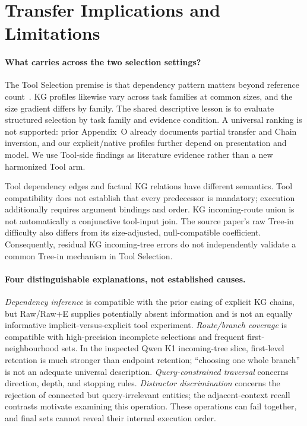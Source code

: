 \section{Transfer Implications and Limitations}
\label{sec:discussion}
\paragraph{What carries across the two selection settings?}
The Tool Selection premise is that dependency pattern matters beyond reference count~\cite{anonymousToolGraph}. KG profiles likewise vary across task families at common sizes, and the size gradient differs by family. The shared descriptive lesson is to evaluate structured selection by task family and evidence condition. A universal ranking is not supported: prior Appendix~O already documents partial transfer and Chain inversion, and our explicit/native profiles further depend on presentation and model. We use Tool-side findings as literature evidence rather than a new harmonized Tool arm.

Tool dependency edges and factual KG relations have different semantics. Tool compatibility does not establish that every predecessor is mandatory; execution additionally requires argument bindings and order. KG incoming-route union is not automatically a conjunctive tool-input join. The source paper's raw Tree-in difficulty also differs from its size-adjusted, null-compatible coefficient. Consequently, residual KG incoming-tree errors do not independently validate a common Tree-in mechanism in Tool Selection.

\paragraph{Four distinguishable explanations, not established causes.}
\emph{Dependency inference} is compatible with the prior easing of explicit KG chains, but Raw/Raw+E supplies potentially absent information and is not an equally informative implicit-versus-explicit tool experiment. \emph{Route/branch coverage} is compatible with high-precision incomplete selections and frequent first-neighbourhood sets. In the inspected Qwen K1 incoming-tree slice, first-level retention is much stronger than endpoint retention; ``choosing one whole branch'' is not an adequate universal description. \emph{Query-constrained traversal} concerns direction, depth, and stopping rules. \emph{Distractor discrimination} concerns the rejection of connected but query-irrelevant entities; the adjacent-context recall contrasts motivate examining this operation. These operations can fail together, and final sets cannot reveal their internal execution order.

